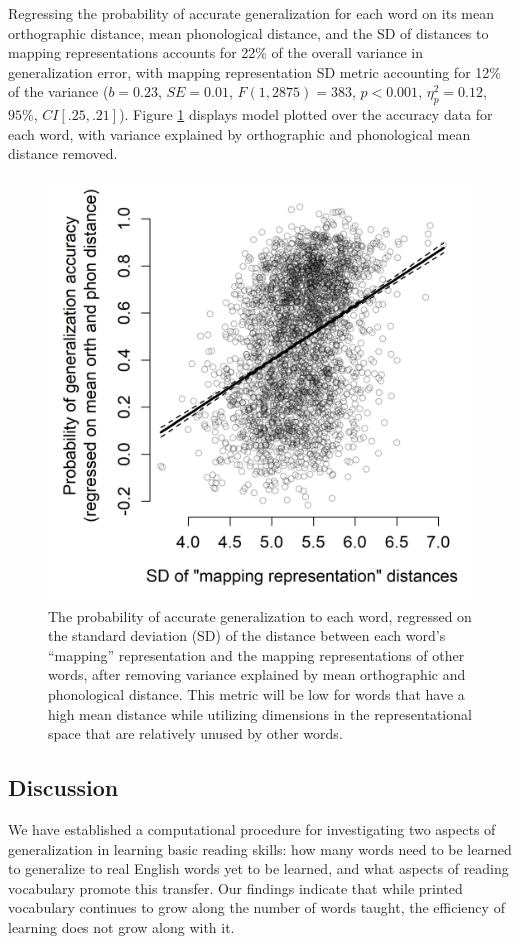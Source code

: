 \documentclass[10pt,letterpaper]{article}
\begin{document}
Regressing the probability of accurate generalization for each word on its mean orthographic distance, mean phonological distance, and the SD of distances to mapping representations accounts for 22\% of the overall variance in generalization error, with mapping representation SD metric accounting for 12\% of the variance ($b = 0.23$, $SE = 0.01$, $F(1, 2875) = 383$, $p < 0.001$, $\eta_p^2 = 0.12$, $95\%$, $CI[.25, .21]$). Figure \ref{word_acc_regression} displays model plotted over the accuracy data for each word, with variance explained by orthographic and phonological mean distance removed.

\begin{figure}[t]
	\includegraphics[width=0.9\columnwidth]{figures/word_accuracy_by_hiddenSD.png}

	\caption{The probability of accurate generalization to each word, regressed on the standard deviation (SD) of the distance between each word's ``mapping'' representation and the mapping representations of other words, after removing variance explained by mean orthographic and phonological distance. This metric will be low for words that have a high mean distance while utilizing dimensions in the representational space that are relatively unused by other words.}
	\label{word_acc_regression}
\end{figure}


\subsection{Discussion}
We have established a computational procedure for investigating two aspects of generalization in learning basic reading skills: how many words need to be learned to generalize to real English words yet to be learned, and what aspects of reading vocabulary promote this transfer.  Our findings indicate that while printed vocabulary continues to grow along the number of words taught, the efficiency of learning does not grow along with it.
\end{document}

